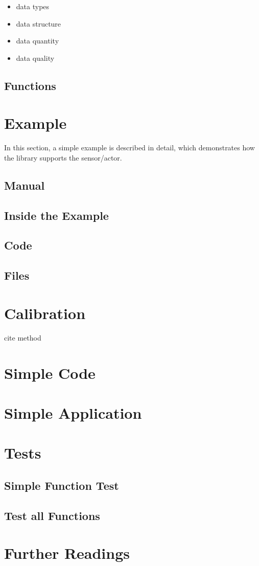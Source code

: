 \begin{itemize}
    \item data types
    \item data structure
    \item data quantity
    \item data quality
\end{itemize}

\subsection{Functions}

\section{Example}

In this section, a simple example is described in detail, which demonstrates how the library supports the sensor/actor.


\subsection{Manual}

\subsection{Inside the Example}

\subsection{Code}

\subsection{Files}



\section{Calibration}

cite method

\section{Simple Code}


\section{Simple Application}



\section{Tests}

\subsection{Simple Function Test}

\subsection{Test all Functions}



\section{Further Readings}

